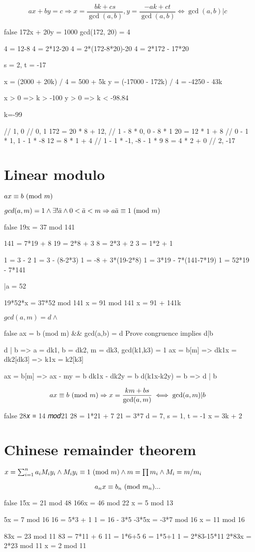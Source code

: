 \documentclass{article}
\begin{document}
$$ax + by = c \Rightarrow x = \frac{bk + cs}{\gcd(a,b)}, y = \frac{-ak + ct}{\gcd(a,b)} \iff \gcd(a,b) | c$$

\if false
172x + 20y = 1000
gcd(172, 20) = 4

4 = 12-8
4 = 2*12-20
4 = 2*(172-8*20)-20
4 = 2*172 - 17*20

s = 2, t = -17

x = (2000 + 20k) / 4 = 500 + 5k
y = (-17000 - 172k) / 4 = -4250 - 43k

x > 0 => k > -100
y > 0 => k < -98.84

k=-99

                    // 1, 0
                    // 0, 1
172 = 20 * 8 + 12,  // 1 - 8 * 0,   0 - 8 * 1
20 = 12 * 1 + 8     // 0 - 1 * 1,   1 - 1 * -8
12 = 8 * 1 + 4      // 1 - 1 * -1,  -8 - 1 * 9
8 = 4 * 2 + 0       // 2,           -17


\fi

\section{Linear modulo}

$ax \equiv b\ (\text{mod}\ m)$

$gcd(a,m) = 1 \wedge \exists! \bar{a} \wedge 0 < \bar{a} < m \Rightarrow a\bar{a} \equiv 1\ (\text{mod}\ m)$

\if false
19x = 37 mod 141

141 = 7*19 + 8
19 = 2*8 + 3
8 = 2*3 + 2
3 = 1*2 + 1

1 = 3 - 2
1 = 3 - (8-2*3)
1 = -8 + 3*(19-2*8)
1 = 3*19 - 7*(141-7*19)
1 = 52*19 - 7*141

\bar{a} = 52

19*52*x = 37*52 mod 141
x = 91 mod 141
x = 91 + 141k
\fi

$gcd(a,m) = d \wedge$

\if false
ax = b (mod m) && gcd(a,b) = d
Prove congruence implies d|b

d | b
=> a = dk1, b = dk2, m = dk3, gcd(k1,k3) = 1
ax = b[m] => dk1x = dk2[dk3] => k1x = k2[k3]

ax = b[m] => ax - my = b
dk1x - dk2y = b
d(k1x-k2y) = b => d | b
\fi

$$ ax \equiv b\ (\text{mod}\ m) \Rightarrow x = \frac{km + bs}{\gcd(a,m)} \iff \gcd(a,m) | b $$

\if false
28𝑥 ≡ 14 𝑚𝑜𝑑21
28 = 1*21 + 7
21 = 3*7
d = 7, s = 1, t = -1
x = 3k + 2
\fi

\section{Chinese remainder theorem}

$x = \sum_{i=1}^{n}{a_iM_iy_i} \wedge M_i y_i \equiv 1\ (\text{mod}\ m) \wedge m = \prod{m_i} \wedge M_i = m/m_i$

$$ a_nx \equiv b_n\ (\text{mod}\ m_n) ... $$

\if false
15x = 21 mod 48
166x = 46 mod 22
x = 5 mod 13

5x = 7 mod 16
    16 = 5*3 + 1
        1 = 16 - 3*5
-3*5x = -3*7 mod 16
x = 11 mod 16

83x = 23 mod 11
    83 = 7*11 + 6
    11 = 1*6+5
    6 = 1*5+1
        1 = 2*83-15*11
2*83x = 2*23 mod 11
x = 2 mod 11
\fi
\end{document}
